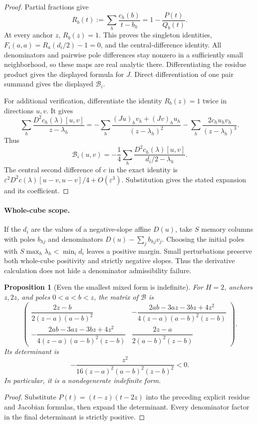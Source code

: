 \documentclass[11pt]{article}
\newtheorem{proposition}[theorem]{Proposition}
\begin{document}
\begin{proof}
Partial fractions give
\[
 R_b(t):=\sum_h\frac{c_h(b)}{t-b_h}=1-\frac{P(t)}{Q_b(t)}.
\]
At every anchor $z$, $R_b(z)=1$. This proves the singleton identities,
$F_i(a,a)=R_a(d_i/2)-1=0$, and the central-difference identity.
All denominators and pairwise pole differences stay nonzero in a
sufficiently small neighborhood, so these maps are real analytic there.
Differentiating the residue product gives the displayed formula for $J$.
Direct differentiation of one pair summand gives the displayed
$\mathcal B_i$.

For additional verification, differentiate the identity $R_b(z)=1$
twice in directions $u,v$. It gives
\[
 \sum_h\frac{D^2c_h(\lambda)[u,v]}{z-\lambda_h}
 =-\sum_h\frac{(Ju)_hv_h+(Jv)_hu_h}{(z-\lambda_h)^2}
   -\sum_h\frac{2c_hu_hv_h}{(z-\lambda_h)^3}.
\]
Thus
\[
 \mathcal B_i(u,v)
 =-\frac14\sum_h\frac{D^2c_h(\lambda)[u,v]}{d_i/2-\lambda_h}.
\]
The central second difference of $c$ in the exact identity is
$\varepsilon^2D^2c(\lambda)[u-v,u-v]/4+O(\varepsilon^3)$.
Substitution gives the stated expansion and its coefficient.
\end{proof}

\paragraph{Whole-cube scope.}
If the $d_i$ are the values of a negative-slope affine $D(u)$, take
$S$ memory columns with poles $b_{hj}$ and denominators
$D(u)-\sum_j b_{hj}v_j$. Choosing the initial poles with
$S\max_h\lambda_h<\min_i d_i$ leaves a positive margin. Small
perturbations preserve both whole-cube positivity and strictly negative
slopes. Thus the derivative calculation does not hide a denominator
admissibility failure.

\begin{proposition}[Even the smallest mixed form is indefinite]
For $H=2$, anchors $z,2z$, and poles $0<a<b<z$, the matrix of
$\mathcal B$ is
\[
 \begin{pmatrix}
 \dfrac{2z-b}{2(z-a)(a-b)^2}&
 -\dfrac{2ab-3az-3bz+4z^2}{4(z-a)(a-b)^2(z-b)}\\[6pt]
 -\dfrac{2ab-3az-3bz+4z^2}{4(z-a)(a-b)^2(z-b)}&
 \dfrac{2z-a}{2(a-b)^2(z-b)}
 \end{pmatrix}.
\]
Its determinant is
\[
 -\frac{z^2}{16(z-a)^2(a-b)^2(z-b)^2}<0.
\]
In particular, it is a nondegenerate indefinite form.
\end{proposition}

\begin{proof}
Substitute $P(t)=(t-z)(t-2z)$ into the preceding explicit residue and
Jacobian formulas, then expand the determinant. Every denominator factor
in the final determinant is strictly positive.
\end{proof}
\end{document}
